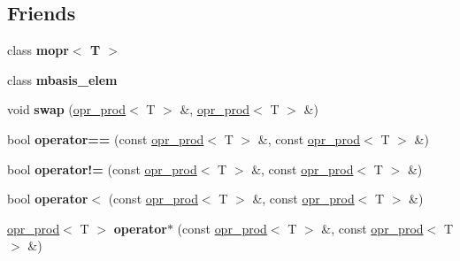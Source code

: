 \subsection*{Friends}
\begin{DoxyCompactItemize}
\item 
\mbox{\label{classqbasis_1_1opr__prod_aea2ca45ecf8a45b45ff4f4d7c7c733bc}} 
class {\bfseries mopr$<$ T $>$}
\item 
\mbox{\label{classqbasis_1_1opr__prod_a3be8150c21a3b566fdd22a8051fad117}} 
class {\bfseries mbasis\+\_\+elem}
\item 
\mbox{\label{classqbasis_1_1opr__prod_aa174cda391f30e813249ef0f1d5be9ac}} 
void {\bfseries swap} (\hyperlink{classqbasis_1_1opr__prod}{opr\+\_\+prod}$<$ T $>$ \&, \hyperlink{classqbasis_1_1opr__prod}{opr\+\_\+prod}$<$ T $>$ \&)
\item 
\mbox{\label{classqbasis_1_1opr__prod_abb9492cc5561e500006f2c2f6b45cfe3}} 
bool {\bfseries operator==} (const \hyperlink{classqbasis_1_1opr__prod}{opr\+\_\+prod}$<$ T $>$ \&, const \hyperlink{classqbasis_1_1opr__prod}{opr\+\_\+prod}$<$ T $>$ \&)
\item 
\mbox{\label{classqbasis_1_1opr__prod_a81dee1d65b034fcf9d257339a49adee7}} 
bool {\bfseries operator!=} (const \hyperlink{classqbasis_1_1opr__prod}{opr\+\_\+prod}$<$ T $>$ \&, const \hyperlink{classqbasis_1_1opr__prod}{opr\+\_\+prod}$<$ T $>$ \&)
\item 
\mbox{\label{classqbasis_1_1opr__prod_aa9b30c0f6fc749f5bc7a3b14142c124c}} 
bool {\bfseries operator$<$} (const \hyperlink{classqbasis_1_1opr__prod}{opr\+\_\+prod}$<$ T $>$ \&, const \hyperlink{classqbasis_1_1opr__prod}{opr\+\_\+prod}$<$ T $>$ \&)
\item 
\mbox{\label{classqbasis_1_1opr__prod_a95f4401359851efdc18b10ae69d694ee}} 
\hyperlink{classqbasis_1_1opr__prod}{opr\+\_\+prod}$<$ T $>$ {\bfseries operator$\ast$} (const \hyperlink{classqbasis_1_1opr__prod}{opr\+\_\+prod}$<$ T $>$ \&, const \hyperlink{classqbasis_1_1opr__prod}{opr\+\_\+prod}$<$ T $>$ \&)
\item 

\end{DoxyCompactItemize}
